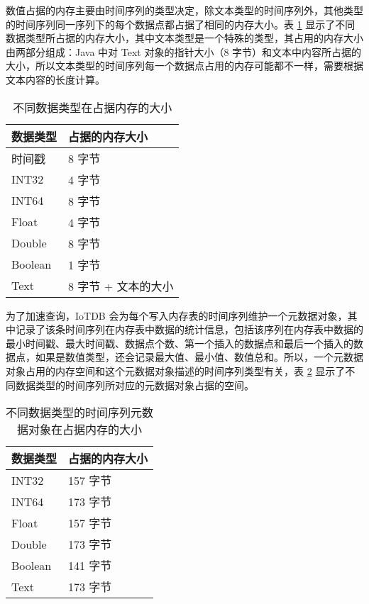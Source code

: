 数值占据的内存主要由时间序列的类型决定，除文本类型的时间序列外，其他类型的时间序列同一序列下的每个数据点都占据了相同的内存大小。表 \ref{tab:data-type-mem-size} 显示了不同数据类型所占据的内存大小，其中文本类型是一个特殊的类型，其占用的内存大小由两部分组成：Java 中对 Text 对象的指针大小（8 字节）和文本中内容所占据的大小，所以文本类型的时间序列每一个数据点占用的内存可能都不一样，需要根据文本内容的长度计算。
\begin{table}
  \centering
  \caption{不同数据类型在占据内存的大小}
  \begin{tabular}{ll}
    \toprule
    数据类型 & 占据的内存大小 \\
    \midrule
    时间戳 & 8 字节 \\
    INT32 & 4 字节 \\
    INT64 & 8 字节 \\
    Float & 4 字节 \\
    Double & 8 字节\\
    Boolean & 1 字节 \\
    Text & 8 字节 + 文本的大小 \\
    \bottomrule
  \end{tabular}
  \label{tab:data-type-mem-size}
\end{table}

为了加速查询，IoTDB 会为每个写入内存表的时间序列维护一个元数据对象，其中记录了该条时间序列在内存表中数据的统计信息，包括该序列在内存表中数据的最小时间戳、最大时间戳、数据点个数、第一个插入的数据点和最后一个插入的数据点，如果是数值类型，还会记录最大值、最小值、数值总和。所以，一个元数据对象占用的内存空间和这个元数据对象描述的时间序列类型有关，表 \ref{tab:data-type-statistic-mem-size} 显示了不同数据类型的时间序列所对应的元数据对象占据的空间。

\begin{table}
  \centering
  \caption{不同数据类型的时间序列元数据对象在占据内存的大小}
  \begin{tabular}{ll}
    \toprule
    数据类型 & 占据的内存大小 \\
    \midrule
    INT32 & 157 字节 \\
    INT64 & 173 字节 \\
    Float & 157 字节 \\
    Double & 173 字节\\
    Boolean & 141 字节 \\
    Text & 173 字节 \\
    \bottomrule
  \end{tabular}
  \label{tab:data-type-statistic-mem-size}
\end{table}

